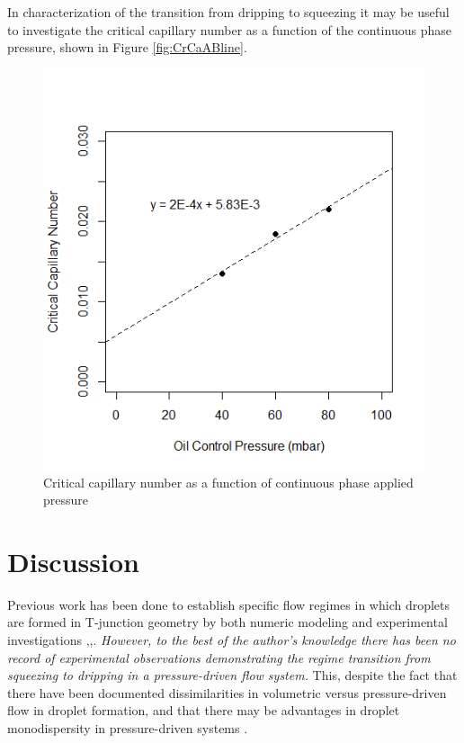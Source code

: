 \clearpage

In characterization of the transition from dripping to squeezing it may be useful to investigate the critical capillary number as a function of the continuous phase pressure, shown in Figure \vref{fig:CrCaABline}.

\begin{figure}
\centering 
\includegraphics[width=0.75\columnwidth]{CrCaABline.PNG} 
\caption[Critical capillary number as a function of continuous phase applied pressure]{Critical capillary number as a function of continuous phase applied pressure} 
\label{fig:CrCaABline} 
\end{figure}


\clearpage

\section{Discussion}

Previous work has been done to establish specific flow regimes in which droplets are formed in T-junction geometry by both numeric modeling and experimental investigations \cite{Abate2012a},\cite{DeMenech2008},\cite{Garstecki2006}. \emph{However, to the best of the author's knowledge there has been no record of experimental observations demonstrating the regime transition from squeezing to dripping in a pressure-driven flow system.} This, despite the fact that there have been documented dissimilarities in volumetric versus pressure-driven flow in droplet formation\cite{Ward2005}, and that there may be advantages in droplet monodispersity in pressure-driven systems \cite{Christopher2008}\cite{Li2014a}. 

